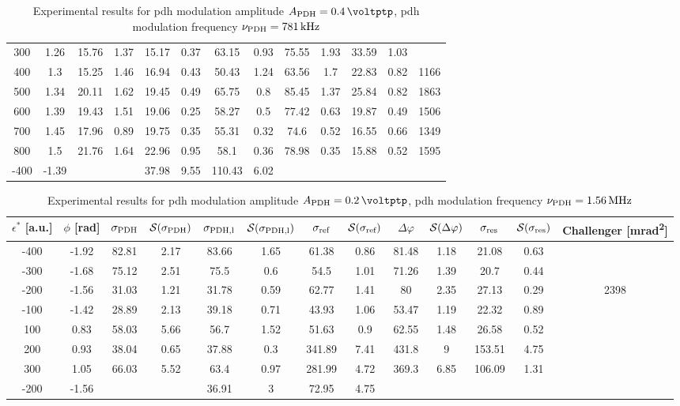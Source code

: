 \begin{landscape}
\begin{table}
\begin{tabular}{|c|c|c|c|c|c|c|c|c|c|c|c|c|}
		300 & 1.26 & 15.76 & 1.37 & 15.17 & 0.37 & 63.15 & 0.93 & 75.55 & 1.93 & 33.59 & 1.03 & \\
		400 & 1.3 & 15.25 & 1.46 & 16.94 & 0.43 & 50.43 & 1.24 & 63.56 & 1.7 & 22.83 & 0.82 & 1166\\
		500 & 1.34 & 20.11 & 1.62 & 19.45 & 0.49 & 65.75 & 0.8 & 85.45 & 1.37 & 25.84 & 0.82 & 1863\\
		600 & 1.39 & 19.43 & 1.51 & 19.06 & 0.25 & 58.27 & 0.5 & 77.42 & 0.63 & 19.87 & 0.49 & 1506\\
		700 & 1.45 & 17.96 & 0.89 & 19.75 & 0.35 & 55.31 & 0.32 & 74.6 & 0.52 & 16.55 & 0.66 & 1349\\
		800 & 1.5 & 21.76 & 1.64 & 22.96 & 0.95 & 58.1 & 0.36 & 78.98 & 0.35 & 15.88 & 0.52 & 1595\\
		\hline
		\hline
		-400 & -1.39 & & & 37.98 & 9.55 & 110.43 & 6.02 & & & & & \\
		\hline
	\end{tabular}
	\caption{Experimental results for \gls{pdh} modulation amplitude $\tind{A}{PDH} = \SI{0.4}{\voltptp}$, \gls{pdh} modulation frequency $\nu_{\text{PDH}} = \SI{781}{\kilo\hertz}$}
	\end{table}
	
	
	\begin{table}
	\centering
	\begin{tabular}{|c|c|c|c|c|c|c|c|c|c|c|c|c|}
		\hline
		$\epsilon^*$ [a.u.] & $\phi$ [\si{\radian}] & $\sigma_{\text{PDH}}$ & $\mathcal{S}(\sigma_{\text{PDH}})$ & $\sigma_{\text{PDH,l}}$ & $\mathcal{S}(\sigma_{\text{PDH,l}})$  & $\sigma_{\text{ref}}$ & $\mathcal{S}(\sigma_{\text{ref}})$ & $\Delta \varphi$ & $\mathcal{S}(\Delta \varphi)$ & $\sigma_{\text{res}}$  & $\mathcal{S}(\sigma_{\text{res}})$ & Challenger [\si{\milli\radian\squared}] \\
		\hline
		\hline
		-400 & -1.92 & 82.81 & 2.17 & 83.66 & 1.65 & 61.38 & 0.86 & 81.48 & 1.18 & 21.08 & 0.63 & \\
		-300 & -1.68 & 75.12 & 2.51 & 75.5 & 0.6 & 54.5 & 1.01 & 71.26 & 1.39 & 20.7 & 0.44 & \\
		-200 & -1.56 & 31.03 & 1.21 & 31.78 & 0.59 & 62.77 & 1.41 & 80 & 2.35 & 27.13 & 0.29 & 2398\\
		-100 & -1.42 & 28.89 & 2.13 & 39.18 & 0.71 & 43.93 & 1.06 & 53.47 & 1.19 & 22.32 & 0.89 & \\
		100 & 0.83 & 58.03 & 5.66 & 56.7 & 1.52 & 51.63 & 0.9 & 62.55 & 1.48 & 26.58 & 0.52 & \\
		200 & 0.93 & 38.04 & 0.65 & 37.88 & 0.3 & 341.89 & 7.41 & 431.8 & 9 & 153.51 & 4.75 & \\
		300 & 1.05 & 66.03 & 5.52 & 63.4 & 0.97 & 281.99 & 4.72 & 369.3 & 6.85 & 106.09 & 1.31 & \\
		\hline
		\hline
		-200 & -1.56 & & & 36.91 & 3 & 72.95 & 4.75 & & & & & \\
		\hline
	\end{tabular}
	\caption{Experimental results for \gls{pdh} modulation amplitude $\tind{A}{PDH} = \SI{0.2}{\voltptp}$, \gls{pdh} modulation frequency $\nu_{\text{PDH}} = \SI{1.56}{\mega\hertz}$}
	\end{table}
	

\end{landscape}

